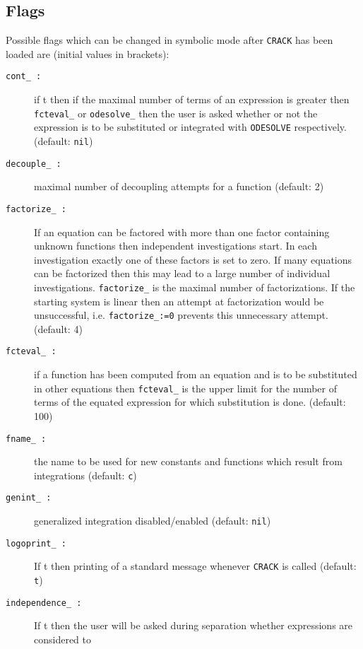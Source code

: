 \subsection{Flags}
Possible flags which can be changed in symbolic mode
after {\tt CRACK} has been loaded are (initial values in brackets):
\begin{description}    
\item[{\tt cont\_ :}] if t then if the maximal number of terms of an expression
             is greater then {\tt fcteval\_} or {\tt odesolve\_} then
             the user is asked 
             whether or not the expression is to be substituted or integrated
             with {\tt ODESOLVE} respectively.  (default: {\tt nil}) 
\item[{\tt decouple\_ :}] maximal number of decoupling attempts for a 
             function (default: 2) 
\item[{\tt factorize\_ :}] If an equation can be factored with more than one 
             factor
             containing unknown functions then independent investigations
             start. In each investigation exactly one of these factors is set 
             to zero. If 
             many equations can be factorized then this may lead to a large 
             number of individual investigations. {\tt factorize\_} is the
             maximal number 
             of factorizations. If the starting system is linear then
             an attempt at factorization would be unsuccessful, i.e.
             {\tt factorize\_:=0} prevents this unnecessary 
             attempt. (default: 4) 
\item[{\tt fcteval\_ :}] if a function has been computed from an equation and 
             is to
             be substituted in other equations then {\tt fcteval\_} is the 
             upper limit for the number of terms of the equated expression
             for which substitution is done. (default: 100) 
\item[{\tt fname\_ :}] the name to be used for new constants and functions 
             which result from integrations  (default: {\tt c})  
\item[{\tt genint\_ :}] generalized integration disabled/enabled 
             (default: {\tt nil}) 
\item[{\tt logoprint\_ :}] If t then printing of a standard message whenever 
             {\tt CRACK} is called (default: {\tt t}) 
\item[{\tt independence\_ :}] If t then the user will be asked during
             separation whether expressions are considered to

\end{description}
